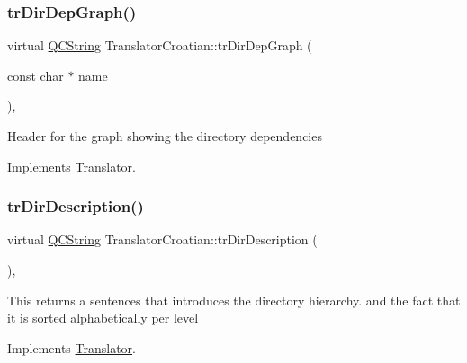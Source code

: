 \mbox{\label{class_translator_croatian_a96c6dffa8db6ee66e1fda8234d78f3de}} 
\subsubsection{\texorpdfstring{trDirDepGraph()}{trDirDepGraph()}}
{\footnotesize\ttfamily virtual \mbox{\hyperlink{class_q_c_string}{Q\+C\+String}} Translator\+Croatian\+::tr\+Dir\+Dep\+Graph (\begin{DoxyParamCaption}\item[{const char $\ast$}]{name }\end{DoxyParamCaption})\hspace{0.3cm}{\ttfamily [inline]}, {\ttfamily [virtual]}}

Header for the graph showing the directory dependencies 

Implements \mbox{\hyperlink{class_translator}{Translator}}.

\mbox{\label{class_translator_croatian_ac96115200792ccb74b3ade5287d2413f}} 
\subsubsection{\texorpdfstring{trDirDescription()}{trDirDescription()}}
{\footnotesize\ttfamily virtual \mbox{\hyperlink{class_q_c_string}{Q\+C\+String}} Translator\+Croatian\+::tr\+Dir\+Description (\begin{DoxyParamCaption}{ }\end{DoxyParamCaption})\hspace{0.3cm}{\ttfamily [inline]}, {\ttfamily [virtual]}}

This returns a sentences that introduces the directory hierarchy. and the fact that it is sorted alphabetically per level 

Implements \mbox{\hyperlink{class_translator}{Translator}}.

\mbox{\label{class_translator_croatian_a885f3f4960c83f070ac69639df98eadf}} 
